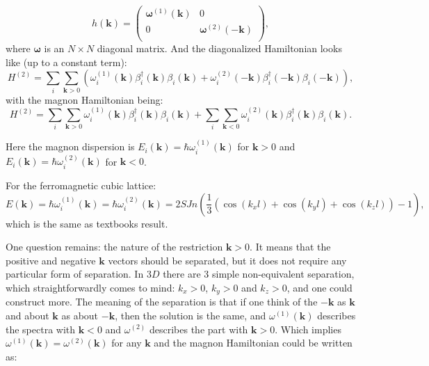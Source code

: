 \documentclass[a4paper,12pt]{article}
\begin{document}
            \begin{equation}
                h(\boldsymbol{k}) = 
                \begin{pmatrix}
                    \boldsymbol{\omega}^{(1)}(\boldsymbol{k}) & 0 \\
                    0 & \boldsymbol{\omega}^{(2)}(-\boldsymbol{k}) \\
                \end{pmatrix}, 
            \end{equation}
            where $\boldsymbol{\omega}$ is an $N\times N$  diagonal matrix. And the diagonalized Hamiltonian looks like (up to a constant term):
            \begin{equation}
                H^{(2)} = \sum_{i}\sum_{\boldsymbol{k} > 0}\left(\omega_i^{(1)}(\boldsymbol{k})\beta^{\dag}_i(\boldsymbol{k})\beta_i(\boldsymbol{k}) + 
                \omega_i^{(2)}(-\boldsymbol{k})\beta^{\dag}_i(-\boldsymbol{k})\beta_i(-\boldsymbol{k})\right),
            \end{equation}
            with the magnon Hamiltonian being:
            \begin{equation}
                H^{(2)} = \sum_{i}\sum_{\boldsymbol{k} > 0}\omega_i^{(1)}(\boldsymbol{k})\beta^{\dag}_i(\boldsymbol{k})\beta_i(\boldsymbol{k}) + 
                \sum_{i}\sum_{\boldsymbol{k} < 0}\omega_i^{(2)}(\boldsymbol{k})\beta^{\dag}_i(\boldsymbol{k})\beta_i(\boldsymbol{k}).
            \end{equation}

            Here the magnon dispersion is $E_i(\boldsymbol{k}) = \hbar \omega_i^{(1)}(\boldsymbol{k})$ for $\boldsymbol{k} > 0$ and 
            $E_i(\boldsymbol{k}) = \hbar \omega_i^{(2)}(\boldsymbol{k})$ for $\boldsymbol{k} <0$.
            
            
            For the ferromagnetic cubic lattice:
            \begin{equation}
                E(\boldsymbol{k}) = 
                \hbar \omega_i^{(1)}(\boldsymbol{k}) =
                \hbar \omega_i^{(2)}(\boldsymbol{k}) = 
                2SJn\left(\dfrac{1}{3}\left(\cos(k_xl) + \cos(k_yl) + \cos(k_zl)\right) - 1\right),
            \end{equation}
            which is the same as textbooks result.


            One question remains: the nature of the restriction $ \boldsymbol{k} > 0$. It means that the positive and negative $\boldsymbol{k}$ vectors should be separated, 
            but it does not require any particular form of separation. In $3D$ there are 3 simple non-equivalent separation, 
            which straightforwardly comes to mind: $k_x > 0$, $k_y > 0$ and $k_z > 0$, and one could construct more. 
            The meaning of the separation is that if one think of the $-\boldsymbol{k}$ as $\boldsymbol{k}$ and about $\boldsymbol{k}$ as about $-\boldsymbol{k}$, 
            then the solution is the same, and $\omega^{(1)}(\boldsymbol{k})$ describes the spectra with $\boldsymbol{k} < 0$ 
            and $\omega^{(2)}$ describes the part with $\boldsymbol{k} > 0$. Which implies $\omega^{(1)}(\boldsymbol{k}) = \omega^{(2)}(\boldsymbol{k})$ 
            for any $\boldsymbol{k}$ and the magnon Hamiltonian could be written as:
\end{document}
